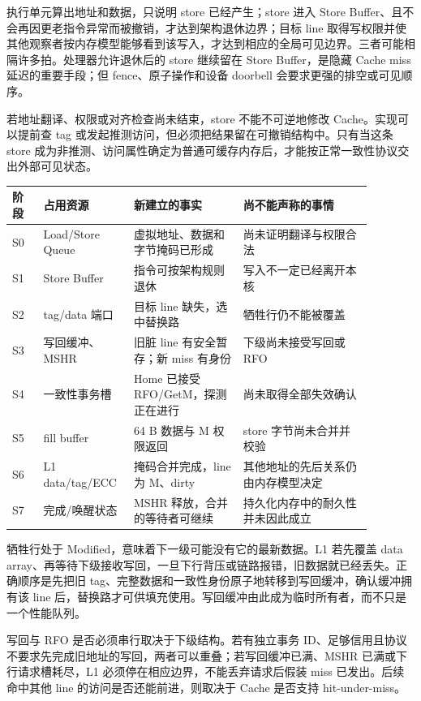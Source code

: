 
执行单元算出地址和数据，只说明 store 已经产生；store 进入 Store Buffer、且不会再因更老指令异常而被撤销，才达到架构退休边界；目标 line 取得写权限并使其他观察者按内存模型能够看到该写入，才达到相应的全局可见边界。三者可能相隔许多拍。处理器允许退休后的 store 继续留在 Store Buffer，是隐藏 Cache miss 延迟的重要手段；但 fence、原子操作和设备 doorbell 会要求更强的排空或可见顺序。

若地址翻译、权限或对齐检查尚未结束，store 不能不可逆地修改 Cache。实现可以提前查 tag 或发起推测访问，但必须把结果留在可撤销结构中。只有当这条 store 成为非推测、访问属性确定为普通可缓存内存后，才能按正常一致性协议交出外部可见状态。

\begin{longtable}{L{0.08\linewidth}L{0.19\linewidth}L{0.28\linewidth}L{0.33\linewidth}}
\toprule
阶段 & 占用资源 & 新建立的事实 & 尚不能声称的事情 \\
\midrule
S0 & Load/Store Queue & 虚拟地址、数据和字节掩码已形成 & 尚未证明翻译与权限合法 \\\tablerowrule
S1 & Store Buffer & 指令可按架构规则退休 & 写入不一定已经离开本核 \\\tablerowrule
S2 & tag/data 端口 & 目标 line 缺失，选中替换路 & 牺牲行仍不能被覆盖 \\\tablerowrule
S3 & 写回缓冲、MSHR & 旧脏 line 有安全暂存；新 miss 有身份 & 下级尚未接受写回或 RFO \\\tablerowrule
S4 & 一致性事务槽 & Home 已接受 RFO/GetM，探测正在进行 & 尚未取得全部失效确认 \\\tablerowrule
S5 & fill buffer & 64 B 数据与 M 权限返回 & store 字节尚未合并并校验 \\\tablerowrule
S6 & L1 data/tag/ECC & 掩码合并完成，line 为 M、dirty & 其他地址的先后关系仍由内存模型决定 \\\tablerowrule
S7 & 完成/唤醒状态 & MSHR 释放，合并的等待者可继续 & 持久化内存中的耐久性并未因此成立 \\
\bottomrule
\end{longtable}


牺牲行处于 Modified，意味着下一级可能没有它的最新数据。L1 若先覆盖 data array、再等待下级接收写回，一旦下行背压或链路报错，旧数据就已经丢失。正确顺序是先把旧 tag、完整数据和一致性身份原子地转移到写回缓冲，确认缓冲拥有该 line 后，替换路才可供填充使用。写回缓冲由此成为临时所有者，而不只是一个性能队列。

写回与 RFO 是否必须串行取决于下级结构。若有独立事务 ID、足够信用且协议不要求先完成旧地址的写回，两者可以重叠；若写回缓冲已满、MSHR 已满或下行请求槽耗尽，L1 必须停在相应边界，不能丢弃请求后假装 miss 已发出。后续命中其他 line 的访问是否还能前进，则取决于 Cache 是否支持 hit-under-miss。

